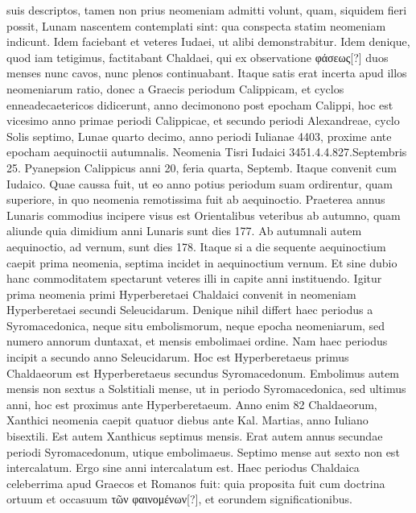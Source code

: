 suis descriptos, tamen non prius neomeniam admitti volunt,
quam, siquidem fieri possit, Lunam nascentem contemplati sint: qua
conspecta statim neomeniam indicunt.
Idem faciebant et veteres Iudaei,
ut alibi demonstrabitur.
Idem denique, quod iam tetigimus, factitabant
Chaldaei, qui ex observatione \textgreek{φάσεως[?]} duos menses nunc cavos,
nunc plenos continuabant.
Itaque satis erat incerta apud illos neomeniarum
ratio, donec a Graecis periodum Calippicam, et cyclos
enneadecaetericos didicerunt, anno decimonono post epocham Calippi,
hoc est vicesimo anno primae periodi Calippicae, et secundo periodi
Alexandreae, cyclo Solis septimo, Lunae quarto decimo, anno periodi
Iulianae 4403, proxime ante epocham aequinoctii autumnalis.
Neomenia
Tisri Iudaici 3451.4.4.827.Septembris 25.
Pyanepsion Calippicus
anni 20, feria quarta,  Septemb. %
Itaque convenit cum Iudaico.
Quae caussa fuit, ut eo anno potius periodum suam ordirentur,
quam superiore, in quo neomenia remotissima fuit ab aequinoctio.
Praeterea annus Lunaris commodius incipere visus est Orientalibus
veteribus ab autumno, quam aliunde quia dimidium anni Lunaris
sunt dies 177.
Ab autumnali autem aequinoctio, ad vernum, sunt dies
178.
Itaque si a die sequente aequinoctium caepit prima neomenia, septima
incidet in aequinoctium vernum.
Et sine dubio hanc commoditatem
spectarunt veteres illi in capite anni instituendo.
Igitur prima
neomenia primi Hyperberetaei Chaldaici convenit in neomeniam
Hyperberetaei secundi Seleucidarum.
Denique nihil differt haec periodus
a Syromacedonica, neque situ embolismorum, neque epocha
neomeniarum, sed numero annorum duntaxat, et mensis embolimaei
ordine.
Nam haec periodus incipit a secundo anno Seleucidarum.
Hoc est Hyperberetaeus primus Chaldaeorum est Hyperberetaeus secundus
Syromacedonum.
Embolimus autem mensis non sextus a
Solstitiali mense, ut in periodo Syromacedonica, sed ultimus anni, hoc
est proximus ante Hyperberetaeum.
Anno enim 82 Chaldaeorum,
Xanthici neomenia caepit quatuor diebus ante Kal. %
 Martias, anno
Iuliano bisextili.
Est autem Xanthicus septimus mensis.
Erat autem
annus  secundae periodi Syromacedonum, utique embolimaeus.
Septimo mense aut sexto non est intercalatum.
Ergo sine anni intercalatum
est.
Haec periodus Chaldaica celeberrima apud Graecos et
Romanos fuit: quia proposita fuit cum doctrina ortuum et occasuum
\textgreek{τῶν φαινομένων[?]}, et eorundem significationibus.

